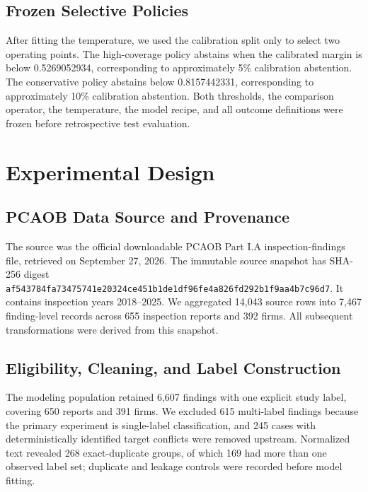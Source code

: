 \documentclass[11pt]{article}
\begin{document}
\subsection{Frozen Selective Policies}

After fitting the temperature, we used the calibration split only to select two
operating points. The high-coverage policy abstains when the calibrated margin is
below 0.5269052934, corresponding to approximately 5\% calibration abstention.
The conservative policy abstains below 0.8157442331, corresponding to approximately
10\% calibration abstention. Both thresholds, the comparison operator, the
temperature, the model recipe, and all outcome definitions were frozen before
retrospective test evaluation.

\section{Experimental Design}
\label{sec:experimental-design}

\subsection{PCAOB Data Source and Provenance}

The source was the official downloadable PCAOB Part I.A inspection-findings file,
retrieved on September 27, 2026. The immutable source snapshot has SHA-256 digest
\texttt{af543784fa73475741e20324ce451b1de1df96fe4a826fd292b1f9aa4b7c96d7}.
It contains inspection years 2018--2025. We aggregated 14,043 source rows into
7,467 finding-level records across 655 inspection reports and 392 firms. All
subsequent transformations were derived from this snapshot.

\subsection{Eligibility, Cleaning, and Label Construction}

The modeling population retained 6,607 findings with one explicit study label,
covering 650 reports and 391 firms. We excluded 615 multi-label findings because
the primary experiment is single-label classification, and 245 cases with
deterministically identified target conflicts were removed upstream. Normalized
text revealed 268 exact-duplicate groups, of which 169 had more than one observed
label set; duplicate and leakage controls were recorded before model fitting.
\end{document}
